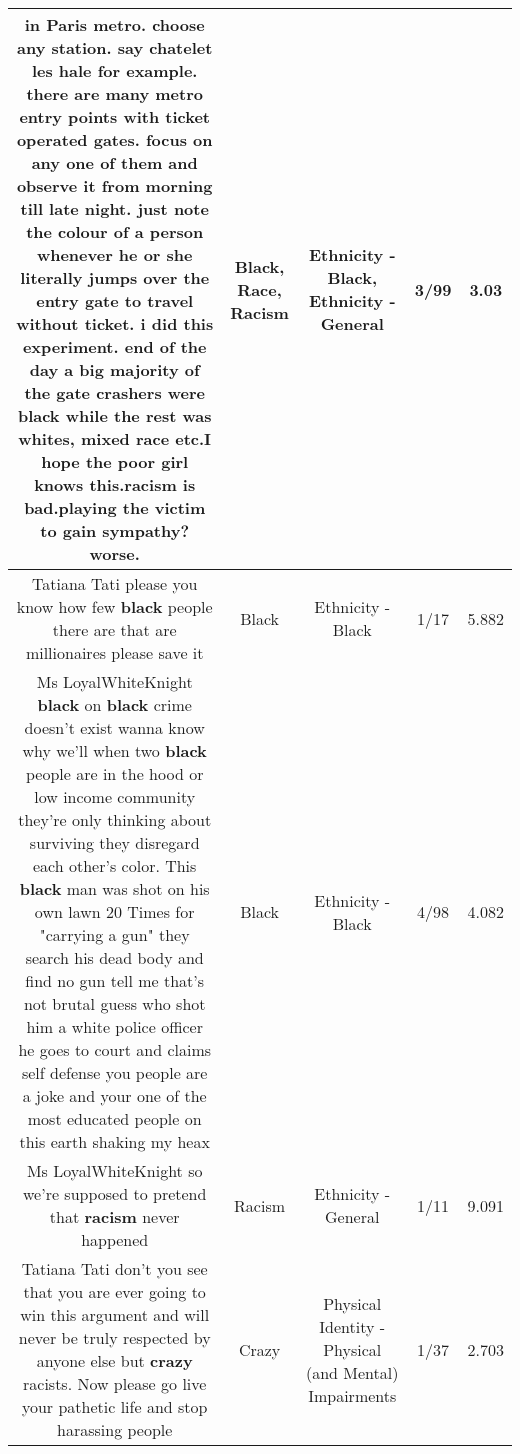 \documentclass[11pt]{article}
\newlength\mylength
\begin{document}
\begin{center}
\begin{longtable}{|C{.65\mylength}|C{.30\mylength}|C{.12\mylength}|C{.12\mylength}|C{.12\mylength}|}
  \small in Paris metro. choose any station. say chatelet les hale for example. there are many metro entry points with ticket operated gates. focus on any one of them and observe it from morning till late night. just note the colour of a person whenever he or she literally jumps over the entry gate to travel without ticket. i did this experiment. end of the day a big majority of the gate crashers were \textbf{black} while the rest was whites, mixed \textbf{race} etc.I hope the poor girl knows this.\textbf{racism} is bad.playing the victim to gain sympathy? worse.\normalsize   & Black, Race, Racism & Ethnicity - Black, Ethnicity - General & 3/99 & 3.03 \\  \hline
  \small Tatiana Tati please you know how few \textbf{black} people there are that are millionaires please save it\normalsize   & Black & Ethnicity - Black & 1/17 & 5.882 \\  \hline
  \small Ms LoyalWhiteKnight \textbf{black} on \textbf{black} crime doesn't exist wanna know why we'll when two \textbf{black} people are in the hood or low income community they're only thinking about surviving they disregard each other's color. This \textbf{black} man was shot on his own lawn 20 Times for "carrying a gun" they search his dead body and find no gun tell me that's not brutal guess who shot him a white police officer he goes to court and claims self defense you people are a joke and your one of the most educated people on this earth shaking my heax\normalsize   & Black & Ethnicity - Black & 4/98 & 4.082 \\  \hline
  \small Ms LoyalWhiteKnight so we're supposed to pretend that \textbf{racism} never happened\normalsize   & Racism & Ethnicity - General & 1/11 & 9.091 \\  \hline
  \small Tatiana Tati don't you see that you are ever going to win this argument and will never be truly respected by anyone else but \textbf{crazy} racists. Now please go live your pathetic life and stop harassing people\normalsize   & Crazy & Physical Identity - Physical (and Mental) Impairments & 1/37 & 2.703 \\  \hline

\end{longtable}
\end{center}
\end{document}

